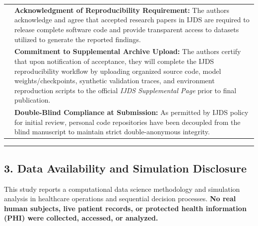\documentclass[11pt,letterpaper]{article}
\newcommand{\checkedbox}{%
  \begin{tikzpicture}[baseline=-0.35ex]%
    \draw[line width=0.8pt, draw=black!85, fill=black!2, rounded corners=0.8pt] (0,0) rectangle (0.33cm,0.33cm);%
    \draw[line width=1.15pt, draw=black!95, line cap=round, line join=round] (0.07cm,0.17cm) -- (0.13cm,0.08cm) -- (0.27cm,0.25cm);%
  \end{tikzpicture}%
}
\begin{document}
\vspace{3pt}
\begin{tabularx}{\textwidth}{@{}p{0.52cm} X@{}}
    \checkedbox & \textbf{Acknowledgment of Reproducibility Requirement:} The authors acknowledge and agree that accepted research papers in IJDS are required to release complete software code and provide transparent access to datasets utilized to generate the reported findings. \\
    \addlinespace[6pt]
    \checkedbox & \textbf{Commitment to Supplemental Archive Upload:} The authors certify that upon notification of acceptance, they will complete the IJDS reproducibility workflow by uploading organized source code, model weights/checkpoints, synthetic validation traces, and environment reproduction scripts to the official \textit{IJDS Supplemental Page} prior to final publication. \\
    \addlinespace[6pt]
    \checkedbox & \textbf{Double-Blind Compliance at Submission:} As permitted by IJDS policy for initial review, personal code repositories have been decoupled from the blind manuscript to maintain strict double-anonymous integrity. \\
\end{tabularx}

\vspace{4pt}
\hrule
\vspace{4pt}

\subsection*{3. Data Availability and Simulation Disclosure}

This study reports a computational data science methodology and simulation analysis in healthcare operations and sequential decision processes. \textbf{No real human subjects, live patient records, or protected health information (PHI) were collected, accessed, or analyzed.}
\end{document}
